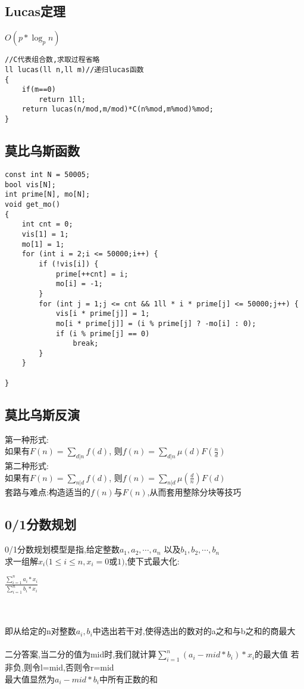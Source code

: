 \documentclass[twocolumn,a4]{article}
\begin{document}
\subsection{Lucas定理}
$O(p*\log_{p}{n})$
\begin{lstlisting}
//C代表组合数,求取过程省略
ll lucas(ll n,ll m)//递归lucas函数
{
    if(m==0)
        return 1ll;
    return lucas(n/mod,m/mod)*C(n%mod,m%mod)%mod;
}
\end{lstlisting}

\subsection{莫比乌斯函数}
\begin{lstlisting}
const int N = 50005;
bool vis[N];
int prime[N], mo[N];
void get_mo()
{
    int cnt = 0;
    vis[1] = 1;
    mo[1] = 1;
    for (int i = 2;i <= 50000;i++) {
        if (!vis[i]) {
            prime[++cnt] = i;
            mo[i] = -1;
        }
        for (int j = 1;j <= cnt && 1ll * i * prime[j] <= 50000;j++) {
            vis[i * prime[j]] = 1;
            mo[i * prime[j]] = (i % prime[j] ? -mo[i] : 0);
            if (i % prime[j] == 0)
                break;
        }
    }

}
\end{lstlisting}
\subsection{莫比乌斯反演}
第一种形式:\\
如果有$F(n) = \sum_{d|n}f(d)$,
则$f(n) = \sum_{d|n}\mu(d)F(\frac{n}{d})$\\
第二种形式:\\
如果有$F(n) = \sum_{n|d}f(d)$,
则$f(n) = \sum_{n|d}\mu(\frac{d}{n})F(d)$\\
套路与难点:构造适当的$f(n)$与$F(n)$,从而套用整除分块等技巧

\subsection{0/1分数规划}
0/1分数规划模型是指,给定整数$a_{1},a_{2},\cdots ,a_{n}$
以及$b_{1},b_{2},\cdots ,b_{n}$\\
求一组解$x_{i}(1\leqslant i\leqslant n,x_{i}=0$或$1)$,使下式最大化:\\
\begin{LARGE}
    $\frac{\sum_{i=1}^{n} a_{i}*x_{i}}{\sum_{i=1}^{n} b_{i}*x_{i}} $
\end{LARGE}
\\
\\
即从给定的n对整数$a_{i},b_{i}$中选出若干对,使得选出的数对的a之和与b之和的商最大
\\
\\
二分答案,当二分的值为mid时,我们就计算$\sum_{i=1}^{n}(a_{i}-mid*b_{i})*x_{i}$的最大值
若非负,则令l=mid,否则令r=mid\\
最大值显然为$a_{i}-mid*b_{i}$中所有正数的和\\
\end{document}

